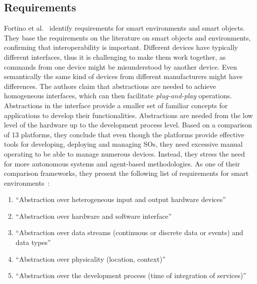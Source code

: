 \subsection{Requirements}

Fortino et al.~\cite{Middlewares_for_Smart_Objects_and_Smart_Environments_Overview_and_Comparison} identify requirements for smart environments and smart objects. They base the requirements on the literature on smart objects and environments, confirming that interoperability is important. Different devices have typically different interfaces, thus it is challenging to make them work together, as commands from one device might be misunderstood by another device. Even semantically the same kind of devices from different manufacturers might have differences. The authors claim that abstractions are needed to achieve homogeneous interfaces, which can then facilitate \emph{plug-and-play} operations. Abstractions in the interface provide a smaller set of familiar concepts for applications to develop their functionalities. Abstractions are needed from the low level of the hardware up to the development process level. Based on a comparison of 13 platforms, they conclude that even though the platforms provide effective tools for developing, deploying and managing SOs, they need excessive manual operating to be able to manage numerous devices. Instead, they stress the need for more autonomous systems and agent-based methodologies. As one of their comparison frameworks, they present the following list of requirements for smart environments~\cite{A_Middleware_for_Intelligent_Environments_and_the_Internet_of_Things}:

\begin{enumerate}
  \item ``Abstraction over heterogeneous input and output hardware devices''%
  \item ``Abstraction over hardware and software interface''%
  \item ``Abstraction over data streams (continuous or discrete data or events) and data types''%
  \item ``Abstraction over physicality (location, context)''
  \item ``Abstraction over the development process (time of integration of services)''
\end{enumerate}

